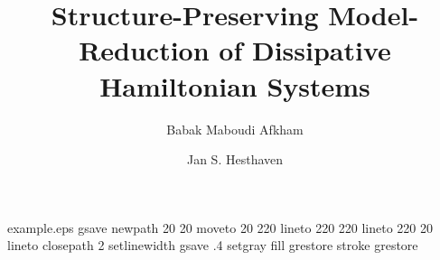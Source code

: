%
%
%
%
%
\begin{filecontents*}{example.eps}
gsave
newpath
  20 20 moveto
  20 220 lineto
  220 220 lineto
  220 20 lineto
closepath
2 setlinewidth
gsave
  .4 setgray fill
grestore
stroke
grestore
\end{filecontents*}
%
\RequirePackage{fix-cm}
%
\documentclass[smallextended]{svjour3}       %
%
\smartqed  %
%
\usepackage{graphicx}
\usepackage{amsmath}
\usepackage{amssymb}
\usepackage{color}
\usepackage{algorithm}
\usepackage{subfig}

%
%
%
%
%


\title{Structure-Preserving Model-Reduction of Dissipative Hamiltonian Systems%
}


\author{Babak Maboudi Afkham         \and
        Jan S. Hesthaven %
}

